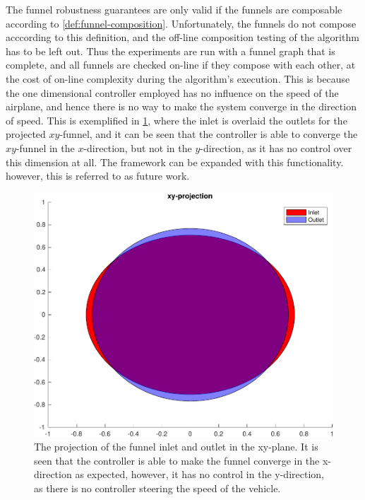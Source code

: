 The funnel robustness
guarantees are only valid if the funnels are composable 
according to \cref{def:funnel-composition}. Unfortunately, the funnels do not
compose acccording to this definition, and the off-line composition
testing of the algorithm has to be left out. Thus the experiments are run with a
funnel graph that is complete, and all funnels are checked on-line if they compose with each other, at
the cost of on-line complexity during the algorithm's execution. This is
because the one dimensional controller employed has no influence on the speed of
the airplane, and hence there is no way to make the system converge in the
direction of speed. This is exemplified in \cref{fig:funnel-inlet-outlet}, where
the inlet is overlaid the outlets for the projected \(xy\)-funnel, and it can be
seen that the controller is able to converge the \(xy\)-funnel in the \(x\)-direction,
but not in the \(y\)-direction, as it has no control over this dimension at all. The
framework can be expanded with this functionality. however, this is
referred to as future work.

\begin{figure}[!t]
  \centering
  \includegraphics[width=.8\columnwidth]{figures/experiments/funnel-inlet-outlet}
  \caption[The projection of the funnel inlet and outlet in the xy-plane]{The projection of the funnel inlet and outlet in the xy-plane. It is
    seen that the controller is able to make the funnel converge in the
    x-direction as expected, however, it has no control in the y-direction, as
    there is no controller steering the speed of the vehicle.}
  \label{fig:funnel-inlet-outlet}
\end{figure}

